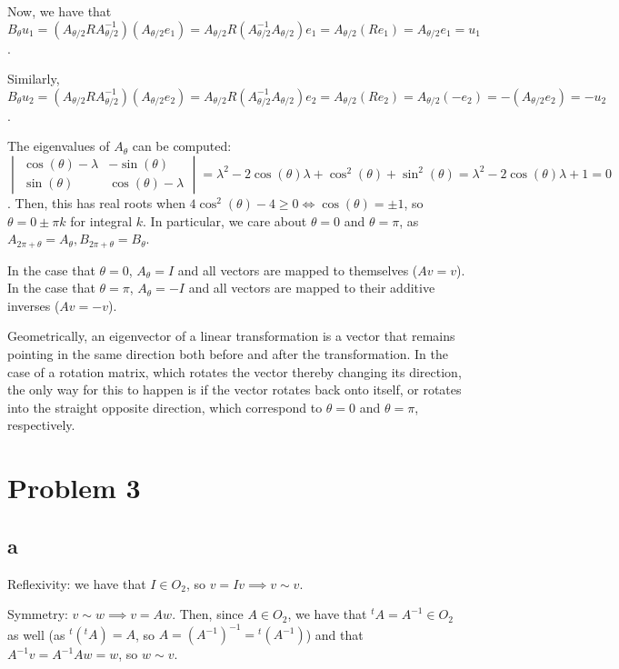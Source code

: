 \documentclass[12pt,letterpaper]{article}
\theoremstyle{definition}
\begin{document}
Now, we have that $B_\theta u_1 = (A_{\theta / 2}RA^{-1}_{\theta / 2})(A_{\theta / 2}e_1) = A_{\theta / 2}R(A^{-1}_{\theta / 2}A_{\theta / 2})e_1 = A_{\theta / 2}(Re_1) = A_{\theta / 2}e_1 = u_1$.

Similarly, $B_\theta u_2 = (A_{\theta / 2}RA^{-1}_{\theta / 2})(A_{\theta / 2}e_2) = A_{\theta / 2}R(A^{-1}_{\theta / 2}A_{\theta / 2})e_2 = A_{\theta / 2}(Re_2) = A_{\theta / 2}(-e_2) = -(A_{\theta / 2}e_2) = -u_2$.

The eigenvalues of $A_\theta$ can be computed: $\begin{vmatrix}\cos(\theta) - \lambda & -\sin(\theta) \\ \sin(\theta) & \cos(\theta) - \lambda \end{vmatrix} = \lambda^2 - 2\cos(\theta)\lambda + \cos^2(\theta) + \sin^2(\theta) = \lambda^2 - 2\cos(\theta)\lambda + 1 = 0$. Then, this has real roots when $4\cos^2(\theta) - 4 \geq 0 \iff \cos(\theta) = \pm1$, so $\theta = 0 \pm \pi k$ for integral $k$. In particular, we care about $\theta = 0$ and $\theta = \pi$, as $A_{2\pi + \theta} = A_\theta, B_{2\pi + \theta} = B_{\theta}$.

In the case that $\theta = 0$, $A_\theta = I$ and all vectors are mapped to themselves ($Av = v$). In the case that $\theta = \pi$, $A_\theta = -I$ and all vectors are mapped to their additive inverses ($Av = -v$). 

Geometrically, an eigenvector of a linear transformation is a vector that remains pointing in the same direction both before and after the transformation. In the case of a rotation matrix, which rotates the vector thereby changing its direction, the only way for this to happen is if the vector rotates back onto itself, or rotates into the straight opposite direction, which correspond to $\theta = 0$ and $\theta = \pi$, respectively.

\section*{Problem 3}

\subsection*{a}

Reflexivity: we have that $I \in O_2$, so $v = Iv \implies v \sim v$.

Symmetry: $v \sim w \implies v = Aw$. Then, since $A \in O_2$, we have that $^t A = A^{-1} \in O_2$ as well (as $^t(^t A) = A$, so $A = (A^{-1})^{-1} = {^t}(A^{-1})$) and that $A^{-1}v = A^{-1}Aw = w$, so $w \sim v$.
\end{document}
